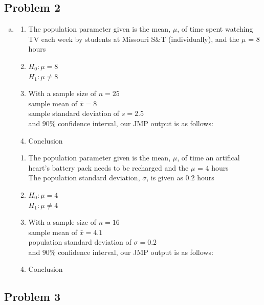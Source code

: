 \documentclass[14pt]{article}
\begin{document}
\subsection*{Problem 2}

\begin{enumerate}[(a)]
\item
\begin{enumerate}[1.]
\item
The population parameter given is the mean, $\mu$, of time spent watching TV each week by students at Missouri S\&T (individually), and the $\mu$ = 8 hours

\item
$H_0 : \mu = 8$ \\
$H_1 : \mu \neq 8$

\item
With a sample size of $n = 25$ \\
sample mean of $\bar{x} = 8$ \\
sample standard deviation of $s = 2.5$ \\ 
and $90$\% confidence interval, our JMP output is as follows: \\

\item
Conclusion

\end{enumerate}
\begin{enumerate}[1.]

\item
The population parameter given is the mean, $\mu$, of time an artifical heart's battery pack needs to be recharged and the $\mu$ = 4 hours \\
The population standard deviation, $\sigma$, is given as 0.2 hours

\item
$H_0 : \mu = 4$ \\
$H_1 : \mu \neq 4$

\item
With a sample size of $n = 16$ \\
sample mean of $\bar{x} = 4.1$ \\
population standard deviation of $\sigma = 0.2$ \\ 
and $90$\% confidence interval, our JMP output is as follows: \\

\item
Conclusion

\end{enumerate}

\end{enumerate}

\pagebreak

\subsection*{Problem 3}
\end{document}
